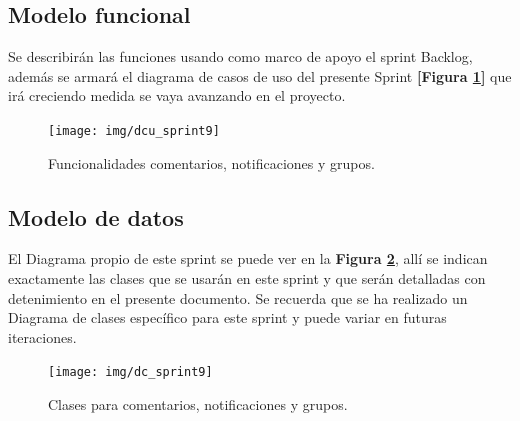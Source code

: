 \subsection{Modelo funcional} 
Se describirán las funciones usando como marco de apoyo el sprint Backlog, además se armará el diagrama de casos de uso del presente Sprint \textbf{[Figura \ref{dcu-sprint-9}]} que irá creciendo  medida se vaya avanzando en el proyecto.

    \begin{figure}[h]
        \centering
        \texttt{[image: img/dcu\_sprint9]}
        \caption{Funcionalidades comentarios, notificaciones y grupos.}
		\label{dcu-sprint-9}
    \end{figure}
    
\subsection{Modelo de datos}
El Diagrama propio de este sprint se puede ver en la \textbf{Figura \ref{9-clases_comentario_grupos}}, allí se indican exactamente las clases que se usarán en este sprint y que serán detalladas con detenimiento en el presente documento. Se recuerda que se ha realizado un Diagrama de clases específico para este sprint y puede variar en futuras iteraciones.

    \begin{figure}[h]
        \centering
        \texttt{[image: img/dc\_sprint9]}
        \caption{Clases para comentarios, notificaciones y grupos.}
		\label{9-clases_comentario_grupos}
    \end{figure}

